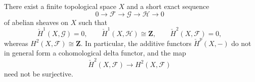 \begin{lemma}
\label{lemma-cech-cohomology-not-delta-functor}
\begin{reference}
\cite[Chapter III, Section 3.8, pp. 174 and 177--179]{Tohoku}
\end{reference}
There exist a finite topological space $X$ and a short exact sequence
$$
0 \to \mathcal{F} \to \mathcal{G} \to \mathcal{H} \to 0
$$
of abelian sheaves on $X$ such that
$$
\check{H}^1(X, \mathcal{G}) = 0, \qquad
\check{H}^1(X, \mathcal{H}) \cong \mathbf{Z}, \qquad
\check{H}^2(X, \mathcal{F}) = 0,
$$
whereas $H^2(X, \mathcal{F}) \cong \mathbf{Z}$. In particular, the
additive functors $\check{H}^p(X, -)$ do not in general form a
cohomological delta functor, and the map
$$
\check{H}^2(X, \mathcal{F}) \longrightarrow H^2(X, \mathcal{F})
$$
need not be surjective.
\end{lemma}

